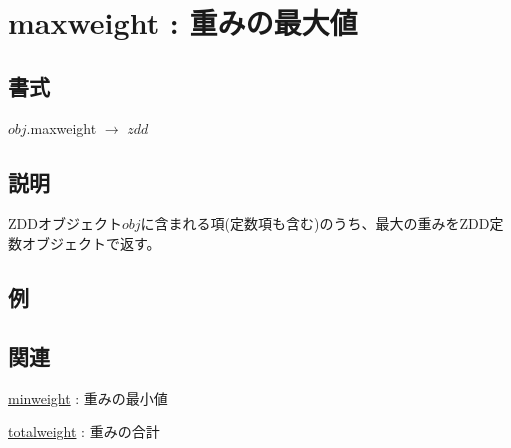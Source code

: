 
\section{maxweight : 重みの最大値\label{sect:maxweight}}
\subsection*{書式}
$obj$.maxweight $\rightarrow$ $zdd$

\subsection*{説明}
ZDDオブジェクト$obj$に含まれる項(定数項も含む)のうち、最大の重みをZDD定数オブジェクトで返す。

\subsection*{例}


\subsection*{関連}
\hyperref[sect:minweight]{minweight} : 重みの最小値

\hyperref[sect:totalweight]{totalweight} : 重みの合計
